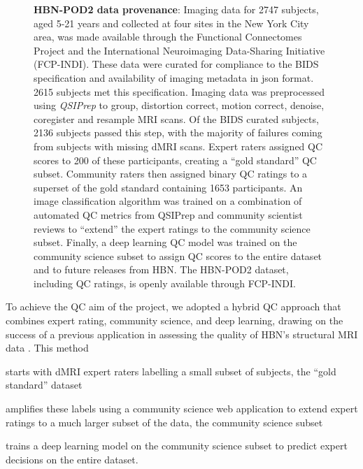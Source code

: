 \documentclass[fleqn,10pt]{wlscirep}
\begin{document}
\begin{figure}[ht]
    \centering
    \caption{%
        {\bf HBN-POD2 data provenance}:
        Imaging data for \num{2747} subjects, aged 5-21 years and collected at four
        sites in the New York City area, was made available through the
        Functional Connectomes Project and the International Neuroimaging
        Data-Sharing Initiative (FCP-INDI).
        These data were curated for compliance to the BIDS specification
        \cite{gorgolewski2016-lh} and availability of imaging metadata in json
        format. \num{2615} subjects met this specification.
        Imaging data was preprocessed using \emph{QSIPrep} \cite{cieslak2021-iq}
        to group, distortion correct, motion correct, denoise, coregister and
        resample MRI scans. Of the BIDS curated subjects, \num{2136} subjects
        passed this step, with the majority of failures coming from subjects
        with missing dMRI scans.
        Expert raters assigned QC scores to \num{200} of these participants,
        creating a ``gold standard'' QC subset. Community raters then assigned
        binary QC ratings to a superset of the gold standard containing
        \num{1653} participants. An image classification algorithm was trained
        on a combination of automated QC metrics from QSIPrep and community
        scientist reviews to ``extend'' the expert ratings to the community
        science subset.  Finally, a deep learning QC model was trained on the
        community science subset to assign QC scores to the entire dataset and
        to future releases from HBN.
        The HBN-POD2 dataset, including QC ratings, is openly available through
        FCP-INDI.
    }
    \label{fig:hbn-sankey}
\end{figure}

To achieve the QC aim of the project, we adopted a hybrid QC approach that
combines expert rating, community science, and deep learning, drawing on the success of a previous application in
assessing the quality of HBN's structural MRI data \cite{keshavan2019-er}.
This method
\begin{enumerate*}[%
    label=(\roman*),%
    before={{ }},%
    itemjoin={{, }},%
    itemjoin*={{ and }}]
    \item starts with dMRI expert raters labelling a small subset of subjects,
    the ``gold standard'' dataset
    \item amplifies these labels using a community science web application to
    extend expert ratings to a much larger subset of the data, the community
    science subset
    \item trains a deep learning model on the community science subset to
    predict expert decisions on the entire dataset.
\end{enumerate*}
\end{document}
